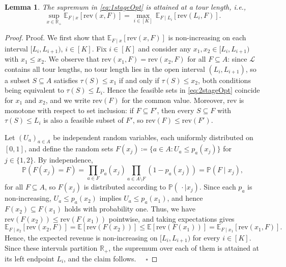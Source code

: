 \documentclass[10pt,a4paper]{amsart}
\newtheorem{lemma}{Lemma}
\newcommand{\Halmos}{\ensuremath{\quad\square}}
\begin{document}
	\begin{lemma} \label{lemma:discretisation_length}
		The supremum in \eqref{eq:1stageOpt} is attained at a tour length, i.e.,
		\[
			\sup_{x \in \mathbb{R}_+} \mathbb{E}_{F\mid x}\left[ \text{rev}(x, F) \right] = \max_{i \in [K]} \, \mathbb{E}_{F\mid L_i}\left[ \text{rev}(L_i, F) \right].
		\]
	\end{lemma}

	\begin{proof}{Proof.}
		We first show that $\mathbb{E}_{F\mid x}\left[ \text{rev}(x, F) \right]$ is non-increasing on each interval $[L_i, L_{i+1})$, $i \in [K]$. Fix $i \in [K]$ and consider any $x_1, x_2 \in [L_i, L_{i+1})$ with $x_1 \leq x_2$. We observe that $\text{rev}(x_1, F) = \text{rev}(x_2, F)$ for all $F \subseteq A$: since $\mathcal{L}$ contains all tour lengths, no tour length lies in the open interval $(L_i, L_{i+1})$, so a subset $S \subseteq A$ satisfies $\tau(S) \leq x_1$ if and only if $\tau(S) \leq x_2$, both conditions being equivalent to $\tau(S) \leq L_i$. Hence the feasible sets in \eqref{eq:2stageOpt} coincide for $x_1$ and $x_2$, and we write $\text{rev}(F)$ for the common value. Moreover, $\text{rev}$ is monotone with respect to set inclusion: if $F \subseteq F'$, then every $S \subseteq F$ with $\tau(S) \leq L_i$ is also a feasible subset of $F'$, so $\text{rev}(F) \leq \text{rev}(F')$.

		Let $(U_a)_{a \in A}$ be independent random variables, each uniformly distributed on $[0,1]$, and define the random sets $F(x_j) \coloneqq \{a \in A \colon U_a \leq p_a(x_j)\}$ for $j \in \{1,2\}$. By independence,
		\begin{equation}\label{eq:help1}
			\mathbb{P}\left(F(x_j) = F\right) = \prod_{a \in F} p_a(x_j) \prod_{a \in A \setminus F} (1 - p_a(x_j)) = \mathbb{P}(F \mid x_j),
		\end{equation}
		for all \(F \subseteq A\),
		so $F(x_j)$ is distributed according to $\mathbb{P}(\,\cdot \mid x_j)$. Since each $p_a$ is non-increasing, $U_a \leq p_a(x_2)$ implies $U_a \leq p_a(x_1)$, and hence $F(x_2) \subseteq F(x_1)$ holds with probability one. Thus, we have $\text{rev}(F(x_2)) \leq \text{rev}(F(x_1))$ pointwise, and taking expectations gives
		\[
			\mathbb{E}_{F\mid x_2}\left[ \text{rev}(x_2, F) \right] = \mathbb{E}\left[ \text{rev}(F(x_2)) \right] \leq \mathbb{E}\left[ \text{rev}(F(x_1)) \right] = \mathbb{E}_{F\mid x_1}\left[ \text{rev}(x_1, F) \right].
		\]
		Hence, the expected revenue is non-increasing on $[L_i, L_{i+1})$ for every $i \in [K]$. Since these intervals partition $\mathbb{R}_+$, the supremum over each of them is attained at its left endpoint $L_i$, and the claim follows.
	\Halmos
\end{proof}
\end{document}
